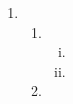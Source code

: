 \documentclass[a4paper]{scrartcl}
\begin{document}
\begin{enumerate}[label=\bfseries\arabic*.]
\begin{enumerate}
        \end{enumerate}

    \item %
        \begin{enumerate}
            \item
                \begin{enumerate}[(i)]
                    \item

                    \item

                \end{enumerate}

            \item

        \end{enumerate}

\end{enumerate}
\end{document}
